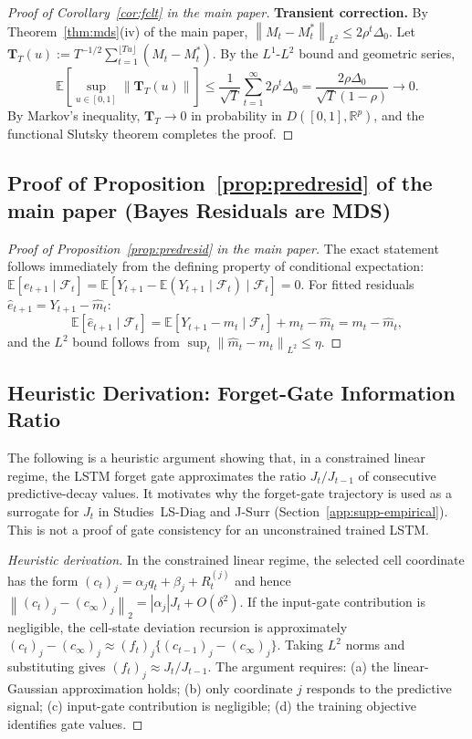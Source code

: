\documentclass[bj,authoryear]{imsart}
\theoremstyle{plain}
\theoremstyle{definition}
\newcommand{\E}{\mathbb{E}}
\newcommand{\R}{\mathbb{R}}
\newcommand{\F}{\mathcal{F}}
\newcommand{\norm}[1]{\left\lVert #1 \right\rVert}
\newcommand{\given}{\mid}
\begin{document}
\begin{proof}[Proof of Corollary~\ref{cor:fclt} in the main paper]
  \textbf{Transient correction.}
  By Theorem~\ref{thm:mds}(iv) of the main paper,
  $\norm{M_t - M_t^*}_{L^2} \leq 2\rho^t\Delta_0$.
  Let $\mathbf{T}_T(u) := T^{-1/2}\sum_{t=1}^{\lfloor Tu\rfloor}(M_t - M_t^*)$.
  By the $L^1$-$L^2$ bound and geometric series,
  \[
    \E\!\left[\sup_{u\in[0,1]}\norm{\mathbf{T}_T(u)}\right]
    \leq \frac{1}{\sqrt{T}}\sum_{t=1}^{\infty}2\rho^t\Delta_0
    = \frac{2\rho\Delta_0}{\sqrt{T}(1-\rho)} \to 0.
  \]
  By Markov's inequality, $\mathbf{T}_T \to 0$ in probability in $D([0,1],\R^p)$,
  and the functional Slutsky theorem completes the proof.
\end{proof}

\subsection{Proof of Proposition~\ref{prop:predresid} of the main paper (Bayes Residuals are MDS)}
\label{app:proof-propresid}

\begin{proof}[Proof of Proposition~\ref{prop:predresid} in the main paper]
  The exact statement follows immediately from the defining property of
  conditional expectation:
  $\E[e_{t+1}\given\F_t]
    = \E[Y_{t+1} - \E(Y_{t+1}\mid\F_t)\mid\F_t] = 0$.
  For fitted residuals $\hat{e}_{t+1} = Y_{t+1} - \hat{m}_t$:
  \[
    \E[\hat{e}_{t+1}\mid\F_t]
    = \E[Y_{t+1} - m_t\mid\F_t] + m_t - \hat{m}_t
    = m_t - \hat{m}_t,
  \]
  and the $L^2$ bound follows from $\sup_t\norm{\hat{m}_t - m_t}_{L^2} \leq \eta$.
\end{proof}

\subsection{Heuristic Derivation: Forget-Gate Information Ratio}
\label{app:proof-forget-heuristic}

\noindent The following is a heuristic argument showing that, in a constrained
linear regime, the LSTM forget gate approximates the ratio $J_t/J_{t-1}$ of
consecutive predictive-decay values.  It motivates why the forget-gate
trajectory is used as a surrogate for $J_t$ in Studies~LS-Diag and J-Surr
(Section~\ref{app:supp-empirical}).
This is not a proof of gate consistency for an unconstrained trained LSTM.

\begin{proof}[Heuristic derivation]
  In the constrained linear regime, the selected cell coordinate has the form
  $(c_t)_j = \alpha_j q_t + \beta_j + R_t^{(j)}$ and hence
  $\norm{(c_t)_j - (c_\infty)_j}_2 = |\alpha_j|J_t + O(\delta^2)$.
  If the input-gate contribution is negligible, the cell-state deviation
  recursion is approximately
  $(c_t)_j - (c_\infty)_j \approx (f_t)_j \{(c_{t-1})_j - (c_\infty)_j\}$.
  Taking $L^2$ norms and substituting gives $(f_t)_j \approx J_t / J_{t-1}$.
  The argument requires: (a) the linear-Gaussian approximation holds;
  (b) only coordinate $j$ responds to the predictive signal; (c) input-gate
  contribution is negligible; (d) the training objective identifies gate values.
\end{proof}
\end{document}
